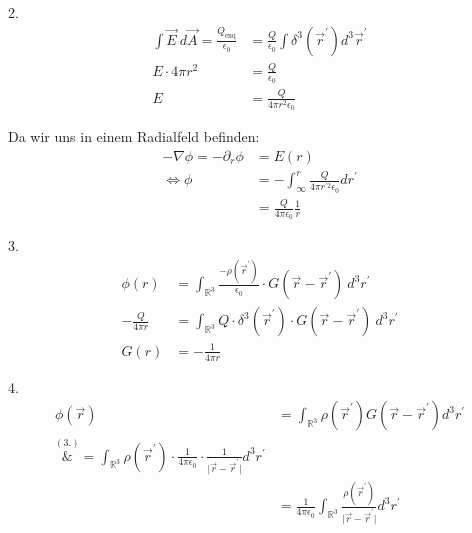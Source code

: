 \documentclass[11pt a4paper]{article}
\newcommand{\epsz}{\epsilon_0}
\newcommand{\kco}{\frac{1}{4\pi\epsilon_0}}
\begin{document}
2.
\begin{align*}
	\int \vec E \ d\vec A = \frac{Q_\text{enq}}{\epsz}
	&= \frac{Q}{\epsz} \int \delta^3(\vec r^\prime) d^3 \vec r^\prime \\
	E \cdot 4\pi r^2 &= \frac{Q}{\epsz} \\
	E &= \frac{Q}{4\pi r^2 \epsz}
\end{align*}

Da wir uns in einem Radialfeld befinden:
\begin{align*}
	-\nabla \phi = -\partial_r \phi
	&= E(r) \\
	\Leftrightarrow
	\phi &= - \int_\infty^r \frac{Q}{4\pi r^{\prime 2} \epsz} dr^\prime
	\\
	&= \frac{Q}{4\pi\epsz} \frac1r
\end{align*}

3.
\begin{align*}
	\phi(r) 
	&= \int_{\mathbb{R}^3} \frac{-\rho(\vec r^\prime)}{\epsz} 
	\cdot G(\vec r - \vec r^\prime) \ d^3r^\prime \\
	- \frac{Q}{4\pi r}
	&= \int_{\mathbb{R}^3} Q \cdot \delta^3(\vec r^\prime)
	\cdot G(\vec r - \vec r^\prime) \ d^3r^\prime \\
	G(r) &= -\frac1{4\pi r}
\end{align*}

4.
\begin{align*}
	\phi (\vec r) 
	&= \int_{\mathbb{R}^3} \rho(\vec r^\prime) G(\vec r - \vec r^\prime)
	d^3r^\prime \\
	\overset{(3.)}&{=} \int_{\mathbb{R}^3} \rho(\vec r^\prime) \cdot
	\frac1{4\pi\epsz} \cdot \frac1 {\vert \vec r - 
	\vec r^\prime \vert}
	d^3r^\prime \\
	&= \kco \int_{\mathbb{R}^3}
	\frac{\rho(\vec r^\prime)} {\vert \vec r - 
	\vec r^\prime \vert}
	d^3r^\prime \\
\end{align*}
\end{document}

